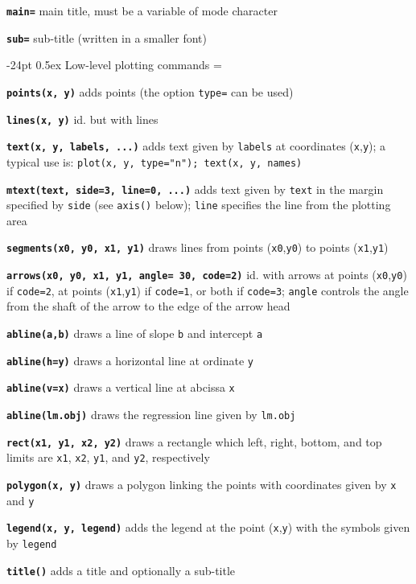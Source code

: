 \documentclass[10pt,landscape]{article}
\makeatletter
\renewcommand\section{\@startsection{section}{1}{0mm}%
                                     {-24pt}%
                                     {0.5ex}%
                                {\color{blue}\normalfont\large\bfseries}}
\newcommand{\code}{\texttt}
\newcommand{\bcode}[1]{\texttt{\textbf{#1}}}
\makeatother
\begin{document}
\begin{multicols}{3}
\bcode{main=}  main title, must be a variable of mode character

\bcode{sub=}  sub-title (written in a smaller font)




\section{Low-level plotting commands}
\everypar={\hangindent=9mm}

\bcode{points(x, y)}  adds points (the option \code{type=} can be used)

\bcode{lines(x, y)}  id. but with lines

\bcode{text(x, y, \mbox{labels}, ...)}  adds text given by \code{labels} at coordinates (\code{x},\code{y}); a typical use is: \code{plot(x, y, type="n"); text(x, y, names)}

\bcode{mtext(text, side=3, line=0, ...)}  adds text given by \code{text} in the margin specified by \code{side} (see \code{axis()} below); \code{line} specifies the line from the plotting area

\bcode{segments(x0, y0, x1, y1)}  draws lines from points (\code{x0},\code{y0}) to points (\code{x1},\code{y1})

\bcode{arrows(x0, y0, x1, y1, angle= 30, code=2)}  id. with arrows at points (\code{x0},\code{y0}) if \code{code=2}, at points (\code{x1},\code{y1}) if \code{code=1}, or both if \code{code=3}; \code{angle} controls the angle from the shaft of the arrow to the edge of the arrow head

\bcode{abline(a,b)}  draws a line of slope \code{b} and intercept \code{a}

\bcode{abline(h=y)}  draws a horizontal line at ordinate \code{y}

\bcode{abline(v=x)}  draws a vertical line at abcissa \code{x}

\bcode{abline(lm.obj)}  draws the regression line given by \code{lm.obj}

\bcode{rect(x1, y1, x2, y2)}  draws a rectangle which left, right, bottom, and top limits are \code{x1}, \code{x2}, \code{y1}, and \code{y2}, respectively

\bcode{polygon(x, y)}  draws a polygon linking the points with coordinates given by \code{x} and \code{y}

\bcode{legend(x, y, legend)}  adds the legend at the point (\code{x},\code{y}) with the symbols given by \code{legend}

\bcode{title()}  adds a title and optionally a sub-title


\end{multicols}
\end{document}
